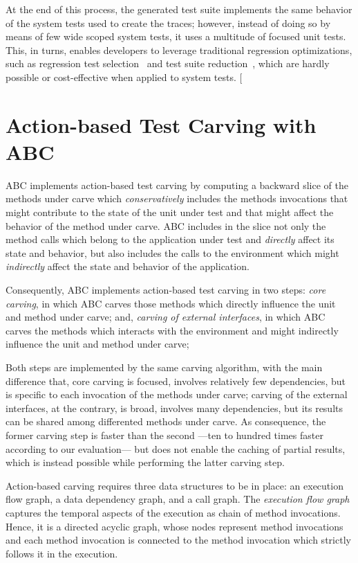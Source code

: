 \documentclass[10pt,conference]{IEEEtran}
\makeatletter
\gdef\xxx{\@ifnextchar[\xxx@lab\xxx@nolab}
\newcommand{\abc}{\textsf{ABC}\xspace}
\makeatother
\begin{document}
\bigskip

At the end of this process, the generated test suite implements the same behavior of the system tests used to create the traces; however, instead of doing so by means of few wide scoped system tests, it uses a multitude of focused unit tests. This, in turns,
enables developers to leverage traditional regression optimizations, such as regression test selection~\cite{} and test suite reduction~\cite{}, which are hardly possible or cost-effective when applied to system tests. \xxx{Forward pointer to the evaluation}

\section{Action-based Test Carving with \abc}
\abc implements action-based test carving by computing a backward slice of the methods under carve which \emph{conservatively} 
includes the methods invocations that might contribute to the state of the unit under test and that might affect the behavior of the method under carve. \abc includes in the slice not only the method calls which belong to the application under test
and \emph{directly} affect its state and behavior, but also includes the calls to the environment which might
\emph{indirectly} affect the state and behavior of the application.

Consequently, \abc implements action-based test carving in two steps:
	\emph{core carving}, in which \abc carves those methods which directly influence the unit and method under carve;
	and, \emph{carving of external interfaces}, in which \abc carves the methods which interacts with the environment and
	might indirectly influence the unit and method under carve;

Both steps are implemented by the same carving algorithm, with the main difference that, 
core carving is focused, involves relatively few dependencies, 
but is specific to each invocation of the methods under carve; 
carving of the external interfaces, at the contrary, is broad, 
involves many dependencies, but its results can be shared among
differented methods under carve. 
As consequence, the former carving step is faster than the second ---ten
 to hundred times faster according to our evaluation--- but does not enable
 the caching of partial results, which is instead possible while performing the latter carving step.

Action-based carving requires three data structures to be in place:
an execution flow graph, a data dependency graph, and a call graph.
%
The \emph{execution flow graph} captures the temporal aspects of the execution as chain of method invocations.
Hence, it is a directed acyclic graph, whose nodes represent method invocations and each method invocation is connected to the method invocation which strictly follows it in the execution.
\end{document}
